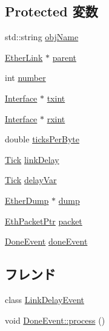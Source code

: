 \subsection*{Protected 変数}
\begin{DoxyCompactItemize}
\item 
std::string \hyperlink{classEtherLink_1_1Link_acdd07b78b47375ca2a51a7a956b1697f}{objName}
\item 
\hyperlink{classEtherLink}{EtherLink} $\ast$ \hyperlink{classEtherLink_1_1Link_a1fab3300fd90e77f99da75330c48ea73}{parent}
\item 
int \hyperlink{classEtherLink_1_1Link_a7106e2abc437ad981830d14176d15f09}{number}
\item 
\hyperlink{classEtherLink_1_1Interface}{Interface} $\ast$ \hyperlink{classEtherLink_1_1Link_a2bd49a849a4ba011c246866c28d079c2}{txint}
\item 
\hyperlink{classEtherLink_1_1Interface}{Interface} $\ast$ \hyperlink{classEtherLink_1_1Link_a7af3399cea116d5b38428072fe507c10}{rxint}
\item 
double \hyperlink{classEtherLink_1_1Link_ab03ddf4a7f12da61f07e2e0c644ef06c}{ticksPerByte}
\item 
\hyperlink{base_2types_8hh_a5c8ed81b7d238c9083e1037ba6d61643}{Tick} \hyperlink{classEtherLink_1_1Link_aa852d273392d09176609c253d66e4848}{linkDelay}
\item 
\hyperlink{base_2types_8hh_a5c8ed81b7d238c9083e1037ba6d61643}{Tick} \hyperlink{classEtherLink_1_1Link_a8a7e67d4dbdb187bf31e657e093a27a6}{delayVar}
\item 
\hyperlink{classEtherDump}{EtherDump} $\ast$ \hyperlink{classEtherLink_1_1Link_ad5a0f1baca11c9598fdb6996bd03ac8c}{dump}
\item 
\hyperlink{classRefCountingPtr}{EthPacketPtr} \hyperlink{classEtherLink_1_1Link_a8bd0d3f7eb9e8d7189c7027028a5fac0}{packet}
\item 
\hyperlink{classEventWrapper}{DoneEvent} \hyperlink{classEtherLink_1_1Link_a26b1662898553a34788c05e358c985ad}{doneEvent}
\end{DoxyCompactItemize}
\subsection*{フレンド}
\begin{DoxyCompactItemize}
\item 
class \hyperlink{classEtherLink_1_1Link_ae08a8e78387040792a618717ab8c6332}{LinkDelayEvent}
\item 
void \hyperlink{classEtherLink_1_1Link_a0342b65d8e630110e69aa6fe485588d9}{DoneEvent::process} ()
\end{DoxyCompactItemize}


